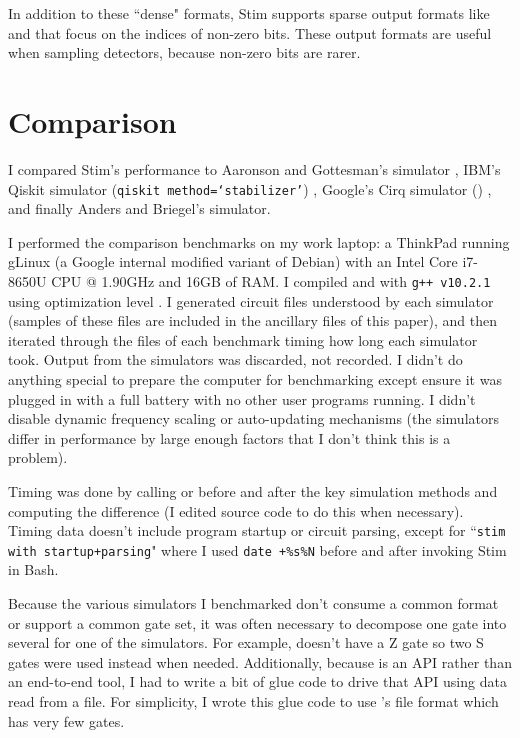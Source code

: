 \documentclass[onecolumn,unpublished]{quantumarticle}
\theoremstyle{definition}
\theoremstyle{definition}
\theoremstyle{definition}
\begin{document}
In addition to these ``dense" formats, Stim supports sparse output formats like  and  that focus on the indices of non-zero bits.
These output formats are useful when sampling detectors, because non-zero bits are rarer.


\section{Comparison}
\label{sec:compare}

I compared Stim's performance to Aaronson and Gottesman's  simulator \cite{aaronson2004chp}, IBM's Qiskit simulator (\texttt{qiskit method=`stabilizer'}) \cite{Qiskit}, Google's Cirq simulator () \cite{quantum_ai_team_and_collaborators_2020_4062499}, and finally Anders and Briegel's  \cite{anders2006fastgraphsim} simulator.

I performed the comparison benchmarks on my work laptop: a ThinkPad running gLinux (a Google internal modified variant of Debian) with an Intel Core i7-8650U CPU @ 1.90GHz and 16GB of RAM.
I compiled  and  with \texttt{g++ v10.2.1} using optimization level .
I generated circuit files understood by each simulator (samples of these files are included in the ancillary files of this paper), and then iterated through the files of each benchmark timing how long each simulator took.
Output from the simulators was discarded, not recorded.
I didn't do anything special to prepare the computer for benchmarking except ensure it was plugged in with a full battery with no other user programs running.
I didn't disable dynamic frequency scaling or auto-updating mechanisms (the simulators differ in performance by large enough factors that I don't think this is a problem).

Timing was done by calling  or  before and after the key simulation methods and computing the difference (I edited source code to do this when necessary).
Timing data doesn't include program startup or circuit parsing, except for ``\texttt{stim with startup+parsing}" where I used \texttt{date +\%s\%N} before and after invoking Stim in Bash.

Because the various simulators I benchmarked don't consume a common format or support a common gate set, it was often necessary to decompose one gate into several for one of the simulators.
For example,  doesn't have a Z gate so two S gates were used instead when needed.
Additionally, because  is an API rather than an end-to-end tool, I had to write a bit of glue code to drive that API using data read from a file.
For simplicity, I wrote this glue code to use 's file format which has very few gates.
\end{document}
